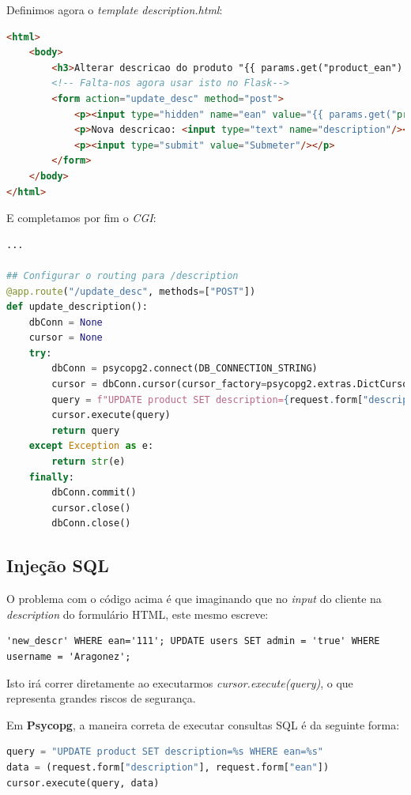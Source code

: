 \documentclass[oneside]{book}
\theoremstyle{definition}
\begin{document}
Definimos agora o \textit{template} \textit{description.html}:
\begin{lstlisting}[language=html, framesep=8pt, xleftmargin=40pt, framexleftmargin=40pt, frame=tb, framerule=0pt]
<html>
    <body>
        <h3>Alterar descricao do produto "{{ params.get("product_ean") }}"</h3>
        <!-- Falta-nos agora usar isto no Flask-->
        <form action="update_desc" method="post">
            <p><input type="hidden" name="ean" value="{{ params.get("product_ean")}}"/></p>
            <p>Nova descricao: <input type="text" name="description"/></p>
            <p><input type="submit" value="Submeter"/></p>
        </form>
    </body>
</html>
\end{lstlisting}

E completamos por fim o \textit{CGI}:
\begin{lstlisting}[language=python, framesep=8pt, xleftmargin=40pt, framexleftmargin=40pt, frame=tb, framerule=0pt]
...

## Configurar o routing para /description
@app.route("/update_desc", methods=["POST"])
def update_description():
    dbConn = None
    cursor = None
    try:
        dbConn = psycopg2.connect(DB_CONNECTION_STRING)
        cursor = dbConn.cursor(cursor_factory=psycopg2.extras.DictCursor)
        query = f"UPDATE product SET description={request.form["description"]} WHERE ean='{request.form["ean"]}';" ## SUJEITO A INJECAO SQL
        cursor.execute(query)
        return query
    except Exception as e:
        return str(e)
    finally:
        dbConn.commit()
        cursor.close()
        dbConn.close()
\end{lstlisting}

\subsection{Injeção SQL}
O problema com o código acima é que imaginando que no \textit{input} do cliente na \textit{description} do formulário HTML, este mesmo escreve:
\begin{verbatim}
'new_descr' WHERE ean='111'; UPDATE users SET admin = 'true' WHERE username = 'Aragonez';
\end{verbatim}
Isto irá correr diretamente ao executarmos \textit{cursor.execute(query)}, o que representa grandes riscos de segurança.

Em \textbf{Psycopg}, a maneira correta de executar consultas SQL é da seguinte forma:
\begin{lstlisting}[language=python, framesep=8pt, xleftmargin=40pt, framexleftmargin=40pt, frame=tb, framerule=0pt]
query = "UPDATE product SET description=%s WHERE ean=%s"
data = (request.form["description"], request.form["ean"])
cursor.execute(query, data)
\end{lstlisting}
\end{document}
